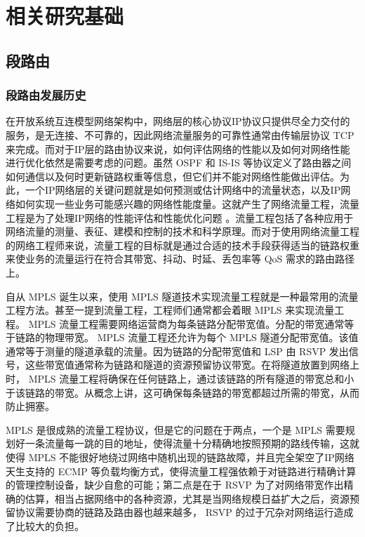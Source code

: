 \chapter{相关研究基础}


\section{段路由}

\subsection{段路由发展历史}

在开放系统互连模型网络架构中，网络层的核心协议IP协议只提供尽全力交付的服务，是无连接、不可靠的，因此网络流量服务的可靠性通常由传输层协议 \gls*{TCP} 来完成。而对于IP层的路由协议来说，如何评估网络的性能以及如何对网络性能进行优化依然是需要考虑的问题。虽然 \gls*{OSPF} 和 \gls*{IS-IS} 等协议定义了路由器之间如何通信以及何时更新链路权重等信息，但它们并不能对网络性能做出评估。为此，一个IP网络层的关键问题就是如何预测或估计网络中的流量状态，以及IP网络如何实现一些业务可能感兴趣的网络性能度量。这就产生了网络流量工程，流量工程是为了处理IP网络的性能评估和性能优化问题 \cite{CNTE} 。流量工程包括了各种应用于网络流量的测量、表征、建模和控制的技术和科学原理。而对于使用网络流量工程的网络工程师来说，流量工程的目标就是通过合适的技术手段获得适当的链路权重来使业务的流量运行在符合其带宽、抖动、时延、丢包率等 \gls*{QoS} 需求的路由路径上。

自从 \gls*{MPLS} 诞生以来，使用 \gls*{MPLS} 隧道技术实现流量工程就是一种最常用的流量工程方法。甚至一提到流量工程，工程师们通常都会着眼 \gls*{MPLS} 来实现流量工程。 \gls*{MPLS} 流量工程需要网络运营商为每条链路分配带宽值。分配的带宽通常等于链路的物理带宽。 \gls*{MPLS} 流量工程还允许为每个 \gls*{MPLS} 隧道分配带宽值。该值通常等于测量的隧道承载的流量。因为链路的分配带宽值和 \gls*{LSP} 由 \gls*{RSVP} 发出信号，这些带宽值通常称为链路和隧道的资源预留协议带宽。在将隧道放置到网络上时， \gls*{MPLS} 流量工程将确保在任何链路上，通过该链路的所有隧道的带宽总和小于该链路的带宽。从概念上讲，这可确保每条链路的带宽都超过所需的带宽，从而防止拥塞。

\gls*{MPLS} 是很成熟的流量工程协议，但是它的问题在于两点，一个是 \gls*{MPLS} 需要规划好一条流量每一跳的目的地址，使得流量十分精确地按照预期的路线传输，这就使得 \gls*{MPLS} 不能很好地绕过网络中随机出现的链路故障，并且完全架空了IP网络天生支持的 \gls*{ECMP} 等负载均衡方式，使得流量工程强依赖于对链路进行精确计算的管理控制设备，缺少自愈的可能；第二点是在于 \gls*{RSVP} 为了对网络带宽作出精确的估算，相当占据网络中的各种资源，尤其是当网络规模日益扩大之后，资源预留协议需要协商的链路及路由器也越来越多， \gls*{RSVP} 的过于冗杂对网络运行造成了比较大的负担。

